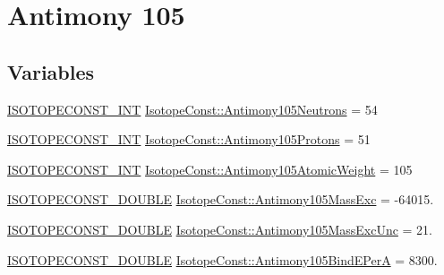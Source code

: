 \hypertarget{group___isotope_const-_antimony-_sb105}{}\section{Antimony 105}
\label{group___isotope_const-_antimony-_sb105}
\subsection*{Variables}
\begin{DoxyCompactItemize}
\item 
\mbox{\hyperlink{group___isotope_const-_macros_ga5f18360b3e99483a35c32d789e62621c}{I\+S\+O\+T\+O\+P\+E\+C\+O\+N\+S\+T\+\_\+\+I\+NT}} \mbox{\hyperlink{group___isotope_const-_antimony-_sb105_ga399e0d4afc1338b26f8d7f7d7a691a95}{Isotope\+Const\+::\+Antimony105\+Neutrons}} = 54
\item 
\mbox{\hyperlink{group___isotope_const-_macros_ga5f18360b3e99483a35c32d789e62621c}{I\+S\+O\+T\+O\+P\+E\+C\+O\+N\+S\+T\+\_\+\+I\+NT}} \mbox{\hyperlink{group___isotope_const-_antimony-_sb105_ga76339c1fad9ab7cb85bac343df320281}{Isotope\+Const\+::\+Antimony105\+Protons}} = 51
\item 
\mbox{\hyperlink{group___isotope_const-_macros_ga5f18360b3e99483a35c32d789e62621c}{I\+S\+O\+T\+O\+P\+E\+C\+O\+N\+S\+T\+\_\+\+I\+NT}} \mbox{\hyperlink{group___isotope_const-_antimony-_sb105_ga968d8c6a366fcb9331c3c4e255ae3148}{Isotope\+Const\+::\+Antimony105\+Atomic\+Weight}} = 105
\item 
\mbox{\hyperlink{group___isotope_const-_macros_ga8f45a7272ce02c0b4c65c44636ed719a}{I\+S\+O\+T\+O\+P\+E\+C\+O\+N\+S\+T\+\_\+\+D\+O\+U\+B\+LE}} \mbox{\hyperlink{group___isotope_const-_antimony-_sb105_ga7dcc9c0accc257b54d3cc164fd038a78}{Isotope\+Const\+::\+Antimony105\+Mass\+Exc}} = -\/64015.
\item 
\mbox{\hyperlink{group___isotope_const-_macros_ga8f45a7272ce02c0b4c65c44636ed719a}{I\+S\+O\+T\+O\+P\+E\+C\+O\+N\+S\+T\+\_\+\+D\+O\+U\+B\+LE}} \mbox{\hyperlink{group___isotope_const-_antimony-_sb105_ga8864d2864d81a6bc1c6377340db84212}{Isotope\+Const\+::\+Antimony105\+Mass\+Exc\+Unc}} = 21.
\item 
\mbox{\hyperlink{group___isotope_const-_macros_ga8f45a7272ce02c0b4c65c44636ed719a}{I\+S\+O\+T\+O\+P\+E\+C\+O\+N\+S\+T\+\_\+\+D\+O\+U\+B\+LE}} \mbox{\hyperlink{group___isotope_const-_antimony-_sb105_ga239a599f5ea55bc9f29931b0e95e4281}{Isotope\+Const\+::\+Antimony105\+Bind\+E\+PerA}} = 8300.
\item 

\end{DoxyCompactItemize}
